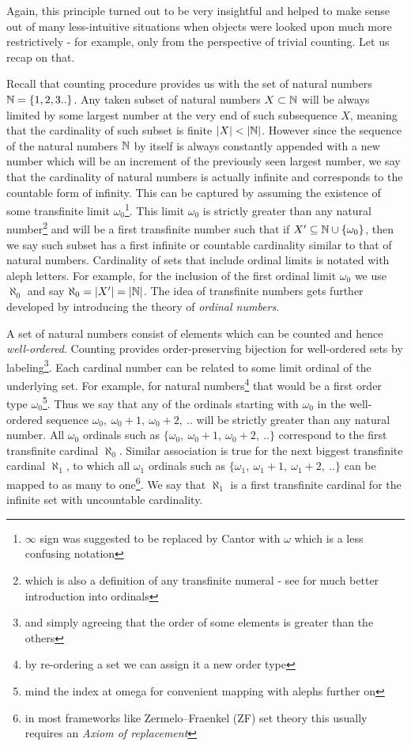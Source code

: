 Again, this principle turned out to be very insightful and helped to make sense out of many less-intuitive situations when objects were looked upon much more restrictively - for example, only from the perspective of trivial counting. Let us recap on that.

Recall that counting procedure provides us with the set of natural numbers $\mathbb{N} = \{1, 2, 3..\}$. Any taken subset of natural numbers $ X \subset \mathbb{N}$ will be always limited by some largest number at the very end of such subsequence $X$, meaning that the cardinality of such subset is finite $|X| < |\mathbb{N}|$. However since the sequence of the natural numbers $\mathbb{N}$ by itself is always constantly appended with a new number which will be an increment of the previously seen largest number, we say that the cardinality of natural numbers is actually infinite and corresponds to the countable form of infinity. This can be captured by assuming the existence of some transfinite limit $\omega_{0}$\footnote{$\infty$ sign was suggested to be replaced by Cantor with $\omega$ which is a less confusing notation\cite{cantor1915contributions}}. This limit $\omega_{0}$ is strictly greater than any natural number\footnote{which is also a definition of any transfinite numeral - see \cite{jech2003set} for much better introduction into ordinals} and will be a first transfinite number such that if $X^\prime \subseteq \mathbb{N} \cup \{\omega_{0}\} $, then we say such subset has a first infinite or countable cardinality similar to that of natural numbers. Cardinality of sets that include ordinal limits is notated with aleph letters. For example, for the inclusion of the first ordinal limit $\omega_{0}$ we use $\aleph_{0}$ and say $ \aleph_{0} = |X^\prime| = |\mathbb{N}|$. The idea of transfinite numbers gets further developed by introducing the theory of \textit{ordinal numbers}\cite{cantor1915contributions}.

A set of natural numbers consist of elements which can be counted and hence \textit{well-ordered}. Counting provides order-preserving bijection for well-ordered sets by labeling\footnote{and simply agreeing that the order of some elements is greater than the others}. Each cardinal number can be related to some limit ordinal of the underlying set. For example, for natural numbers\footnote{by re-ordering a set we can assign it a new order type} that would be a first order type $\omega_{0}$\footnote{mind the index at omega for convenient mapping with alephs further on}. Thus we say that any of the ordinals starting with $\omega_{0}$ in the well-ordered sequence $\omega_{0},\ \omega_{0} + 1,\ \omega_{0} + 2,\ ..  $ will be strictly greater than any natural number. All $\omega_{0}$ ordinals such as $\{\omega_{0},\ \omega_{0} + 1,\ \omega_{0} + 2,\ ..\}$ correspond to the first transfinite cardinal $\aleph_{0}$. Similar association is true for the next biggest transfinite cardinal $\aleph_{1}$, to which all $\omega_{1}$ ordinals such as $\{\omega_{1},\ \omega_{1} + 1,\ \omega_{1} + 2,\ ..\}$ can be mapped to as many to one\footnote{in most frameworks like Zermelo–Fraenkel (ZF) set theory this usually requires an \textit{Axiom of replacement}}. We say that $\aleph_{1}$ is a first transfinite cardinal for the infinite set with uncountable cardinality.

